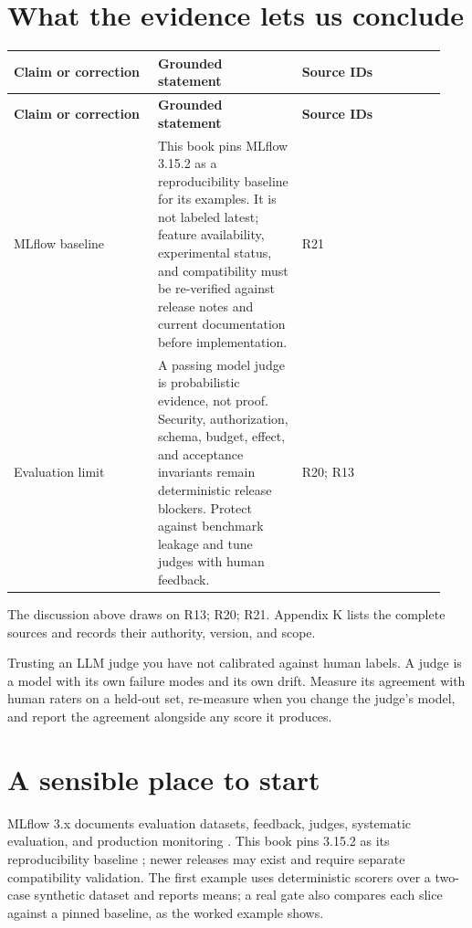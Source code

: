 \section{What the evidence lets us conclude}

\BookTableStart
\small
\begin{longtable}{@{}Y{0.3133\linewidth}Y{0.3133\linewidth}Y{0.3133\linewidth}@{}}
\color{white}\bfseries \textbf{Claim or correction} & \color{white}\bfseries \textbf{Grounded statement} & \color{white}\bfseries \textbf{Source IDs} \\
\endfirsthead
{}
\color{white}\bfseries \textbf{Claim or correction} & \color{white}\bfseries \textbf{Grounded statement} & \color{white}\bfseries \textbf{Source IDs} \\
\endhead
MLflow baseline & This book pins MLflow 3.15.2 as a reproducibility baseline for its examples. It is not labeled latest; feature availability, experimental status, and compatibility must be re-verified against release notes and current documentation before implementation. & R21 \\
Evaluation limit & A passing model judge is probabilistic evidence, not proof. Security, authorization, schema, budget, effect, and acceptance invariants remain deterministic release blockers. Protect against benchmark leakage and tune judges with human feedback. & R20; R13 \\
\end{longtable}
\BookTableEnd

The discussion above draws on R13; R20; R21. Appendix K lists the complete sources and records their authority, version, and scope.\par

\begin{bookantipattern}
Trusting an LLM judge you have not calibrated against human labels. A judge is a model with its own failure modes and its own drift. Measure its agreement with human raters on a held-out set, re-measure when you change the judge's model, and report the agreement alongside any score it produces.
\end{bookantipattern}

\section{A sensible place to start}

MLflow 3.x documents evaluation datasets, feedback, judges, systematic evaluation, and production monitoring . This book pins 3.15.2 as its reproducibility baseline ; newer releases may exist and require separate compatibility validation. The first example uses deterministic scorers over a two-case synthetic dataset and reports means; a real gate also compares each slice against a pinned baseline, as the worked example shows.\par

